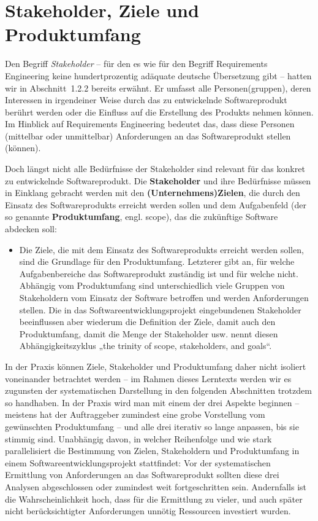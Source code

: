 \section{Stakeholder, Ziele und Produktumfang}
\label{sec:Kap-6.1}

Den Begriff \textit{Stakeholder} -- für den es wie für den Begriff Requirements Engineering keine hundertprozentig adäquate deutsche Übersetzung gibt -- hatten wir in Abschnitt~1.2.2 %
bereits erwähnt. Er umfasst alle Personen(gruppen), deren Interessen in irgendeiner Weise durch das zu entwickelnde Softwareprodukt berührt werden oder die Einfluss auf die Erstellung des Produkts nehmen können. Im Hinblick auf Require\-ments Engineering bedeutet das, dass diese Personen (mittelbar oder unmittelbar) Anforderungen an das Softwareprodukt stellen (können).  

Doch längst nicht alle Bedürfnisse der Stakeholder sind relevant für das konkret zu entwickelnde Softwareprodukt. Die \textbf{Stakeholder} und ihre Bedürfnisse müssen in Einklang gebracht werden mit den \textbf{(Unternehmens)Zielen}, die durch den Einsatz des Softwareprodukts erreicht werden sollen und dem Aufgabenfeld (der so genannte \textbf{Produktumfang}, engl. scope), das die zukünftige Software abdecken soll: 

\begin{itemize}[
		label={\sttpHervorhebung{$\Rightarrow$}},
		]
	\item Die Ziele, 
		die mit dem Einsatz des Softwareprodukts erreicht werden sollen, sind die Grundlage für den Produktumfang. Letzterer gibt an, für welche Aufgabenbereiche das Softwareprodukt zuständig ist und für welche nicht. Abhängig vom Produktumfang sind unterschiedlich viele Gruppen von Stakeholdern vom Einsatz der Software betroffen und werden Anforderungen stellen. Die in das Softwareentwicklungsprojekt eingebundenen Stakeholder beeinflussen aber wiederum die Definition der Ziele, damit auch den Produktumfang, damit die Menge der Stakeholder usw. \cite[44]{rob13} nennt diesen Abhängigkeitszyklus „the trinity of scope, stakeholders, and goals“. 
\end{itemize}

In der Praxis können Ziele, Stakeholder und Produktumfang daher nicht isoliert voneinander betrachtet werden -- im Rahmen dieses Lerntexts werden wir es zugunsten der systematischen Darstellung in den folgenden Abschnitten trotzdem so handhaben. In der Praxis wird man mit einem der drei Aspekte beginnen -- meistens hat der Auftraggeber zumindest eine grobe Vorstellung vom gewünschten Produktumfang -- und alle drei iterativ so lange anpassen, bis sie stimmig sind. Unabhängig davon, in welcher Reihenfolge und wie stark parallelisiert die Bestimmung von Zielen, Stakeholdern und Produktumfang in einem Softwareentwicklungsprojekt stattfindet: Vor der systematischen Ermittlung von Anforderungen an das Softwareprodukt sollten diese drei Analysen abgeschlossen oder zumindest weit fortgeschritten sein. Andernfalls ist die Wahrscheinlichkeit hoch, dass für die Ermittlung zu vieler, und auch später nicht berücksichtigter Anforderungen unnötig Ressourcen investiert wurden.

